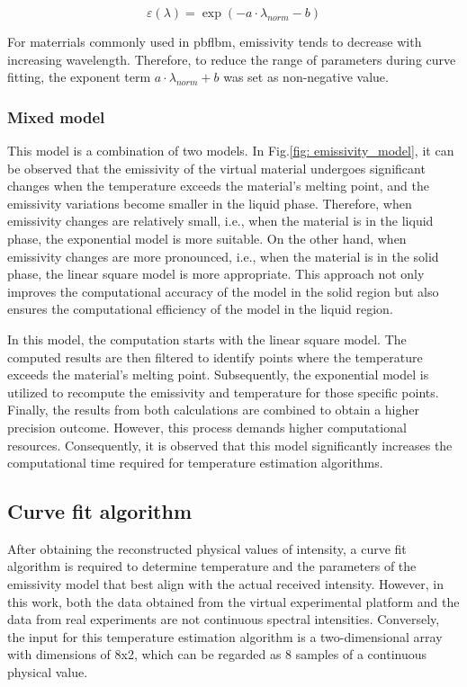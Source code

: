 \begin{equation}
  \label{eq: emi_exp}
  \varepsilon(\lambda) = \exp(-a \cdot \lambda_{norm} - b)
\end{equation}

For materrials commonly used in \gls{pbflbm}, emissivity tends to decrease with 
increasing wavelength. Therefore, to reduce the range of parameters during curve 
fitting, the exponent term $a \cdot \lambda_{norm} + b$ was set as non-negative value.

\subsubsection{Mixed model}
This model is a combination of two models. In Fig.\ref{fig: emissivity_model}, it 
can be observed that the emissivity of the virtual material undergoes 
significant changes when the temperature exceeds the material's melting point, 
and the emissivity variations become smaller in the liquid phase. Therefore, when 
emissivity changes are relatively small, i.e., when the material is in the 
liquid phase, the exponential model is more suitable. On the other hand, when 
emissivity changes are more pronounced, i.e., when the material is in the solid 
phase, the linear square model is more appropriate. This approach not only 
improves the computational accuracy of the model in the solid region but also 
ensures the computational efficiency of the model in the liquid region.


In this model, the computation starts with the linear square model. The computed 
results are then filtered to identify points where the temperature exceeds 
the material's melting point. Subsequently, the exponential model is 
utilized to recompute the emissivity and temperature for those specific points. 
Finally, the results from both calculations are combined to obtain a higher 
precision outcome. However, this process demands higher computational resources. 
Consequently, it is observed that this model significantly increases the 
computational time required for temperature estimation algorithms.


\subsection{Curve fit algorithm}
After obtaining the reconstructed physical values of intensity, 
a curve fit algorithm is required to determine  
temperature and the parameters of the emissivity model that best 
align with the actual received intensity. However, in this work, both 
the data obtained from the virtual experimental platform and the data 
from real experiments are not continuous spectral intensities. 
Conversely, the input for this temperature estimation algorithm is a 
two-dimensional array with dimensions of 8x2, which can be regarded as 8 
samples of a continuous physical value.


